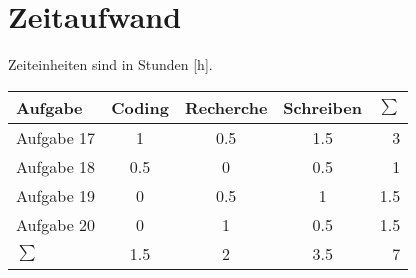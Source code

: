 \section{Zeitaufwand}
Zeiteinheiten sind in Stunden [h].
\begin{table}[h]
    \begin{tabular}{l|ccc|r}
        Aufgabe & Coding & Recherche & Schreiben & $\sum$\\\hline
        Aufgabe 17 & 1 & 0.5 & 1.5 & 3 \\
        Aufgabe 18 & 0.5 & 0 & 0.5 & 1 \\
        Aufgabe 19 & 0 & 0.5 & 1 & 1.5\\
        Aufgabe 20 & 0 & 1 & 0.5 & 1.5 \\\hline
        $\sum$     & 1.5 & 2 & 3.5 & 7
    \end{tabular}
\end{table}